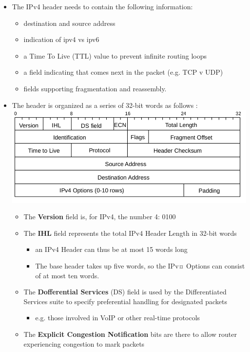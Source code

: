 \documentclass[11pt]{article}
\makeatletter
\def\maxwidth{\ifdim\Gin@nat@width>\linewidth\linewidth
    \else\Gin@nat@width\fi}
\let\Oldincludegraphics\includegraphics
\renewcommand{\includegraphics}[1]{\Oldincludegraphics[width=.8\maxwidth]{#1}}
\providecommand{\tightlist}{%
      \setlength{\itemsep}{0pt}\setlength{\parskip}{0pt}}
\makeatother
\begin{document}
\begin{itemize}
\tightlist
\item
  The IPv4 header needs to contain the following information:

  \begin{itemize}
  \tightlist
  \item
    destination and source address
  \item
    indication of ipv4 vs ipv6
  \item
    a Time To Live (TTL) value to prevent infinite routing loops
  \item
    a field indicating that comes next in the packet (e.g. TCP v UDP)
  \item
    fields supporting fragmentation and reassembly.
  \end{itemize}
\item
  The header is organized as a series of 32-bit words as follows :
  \includegraphics{img/ipv4_header.png}

  \begin{itemize}
  \tightlist
  \item
    The \textbf{Version} field is, for IPv4, the number 4: 0100
  \item
    The \textbf{IHL} field represents the total IPv4 Header Length in
    32-bit words

    \begin{itemize}
    \tightlist
    \item
      an IPv4 Header can thus be at most 15 words long
    \item
      The base header takes up five words, so the IPv¤ Options can
      consist of at most ten words.
    \end{itemize}
  \item
    The \textbf{Dofferential Services} (DS) field is used by the
    Differentiated Services suite to specify preferential handling for
    designated packets

    \begin{itemize}
    \tightlist
    \item
      e.g. those involved in VoIP or other real-time protocols
    \end{itemize}
  \item
    The \textbf{Explicit Congestion Notification} bits are there to
    allow router experiencing congestion to mark packets


\end{itemize}
\end{itemize}
\end{document}
